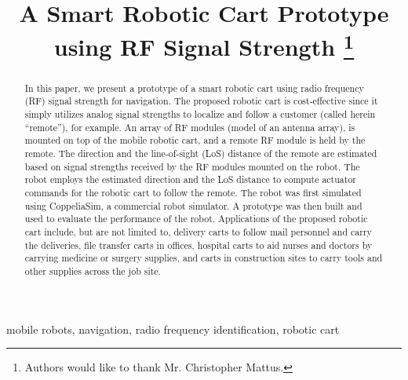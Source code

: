 \documentclass[conference]{IEEEtran}
\begin{document}
\title{A Smart Robotic Cart Prototype using RF Signal Strength \thanks{Authors
    would like to thank Mr. Christopher Mattus.  }
}

\author{
}

\maketitle

\begin{abstract}

  In this paper, we present a prototype of a smart robotic cart using radio
  frequency (RF) signal strength for navigation. The proposed robotic cart is
  cost-effective since it simply utilizes analog signal strengths to localize
  and follow a customer (called herein ``remote''), for example. An array of RF
  modules (model of an antenna array), is mounted on top of the mobile robotic cart,
  and a remote RF module is held by the remote. The direction and the
  line-of-sight (LoS) distance of the remote are estimated based on signal
  strengths received by the RF modules mounted on the robot. The robot employs
  the estimated direction and the LoS distance to compute actuator commands for
  the robotic cart to follow the remote. The robot was first simulated using
  CoppeliaSim, a commercial robot simulator. A prototype was then built and used
  to evaluate the performance of the robot. Applications of the proposed robotic
  cart include, but are not limited to, delivery carts to follow mail personnel
  and carry the deliveries, file transfer carts in offices, hospital carts to
  aid nurses and doctors by carrying medicine or surgery supplies, and carts in
  construction sites to carry tools and other supplies across the job site.
  
\end{abstract}

\begin{IEEEkeywords}
  mobile robots, navigation, radio frequency identification, robotic cart 
\end{IEEEkeywords}
\end{document}
